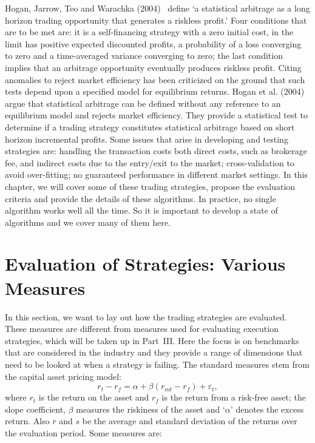 Hogan, Jarrow, Teo and Warachka (2004)~\cite{Hogan} define `a statistical arbitrage as a long horizon trading opportunity that generates a riskless profit.' Four conditions that are to be met are: it is a self-financing strategy with a zero initial cost, in the limit has positive expected discounted profits, a probability of a loss converging to zero and a time-averaged variance converging to zero; the last condition implies that an arbitrage opportunity eventually produces riskless profit. Citing anomalies to reject  market efficiency has been criticized on the ground that such tests depend upon a specified model for equilibrium returns. Hogan et al. (2004)~\cite{Hogan} argue that statistical arbitrage can be defined without any reference to an equilibrium model and rejects market efficiency. They provide a statistical test to determine if a trading strategy constitutes statistical arbitrage based on short horizon incremental profits. Some issues that arise in developing and testing strategies are: handling the transaction costs both direct costs, such as brokerage fee, and indirect costs due to the entry/exit to the market; cross-validation to avoid over-fitting; no guaranteed performance in different market settings. In this chapter, we will cover some of these trading strategies, propose the evaluation criteria and provide the details of these algorithms. In practice, no single algorithm works well all the time. So it is important to develop a state of algorithms and we cover many of them here.



\section{Evaluation of Strategies: Various Measures}

In this section, we want to lay out how the trading strategies are evaluated. These measures are different from measures used for evaluating execution strategies, which will be taken up in Part~III. Here the focus is on benchmarks that are considered in the industry and they provide a range of dimensions that need to be looked at when a strategy is failing. The standard measures stem from the capital asset pricing model:
	\begin{equation}
	r_{t} - r_f = \alpha + \beta (r_{mt} - r_f) + \varepsilon_{t},
	\end{equation}
where $r_t$ is the return on the asset and $r_f$ is the return from a risk-free asset; the slope coefficient, $\beta$ measures the riskiness of the asset and `$\alpha$' denotes the excess return. Also $\overline{r}$ and $s$ be the average and standard deviation of the returns over the evaluation period. Some measures are:

